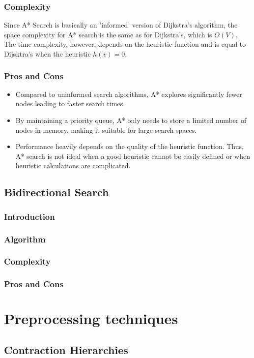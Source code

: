 		\subsubsection{Complexity}
		Since A* Search is basically an 'informed' version of Dijkstra's algorithm, the space complexity for A* search is the same as for Dijkstra's, which is $O(V)$.
		The time complexity, however, depends on the heuristic function and is equal to Dijsktra's when the heuristic $h(v) = 0$.
		\subsubsection{Pros and Cons}
			\begin{itemize}
				\item Compared to uninformed search algorithms, A* explores significantly fewer nodes leading to faster search times. 
				\item By maintaining a priority queue, A* only needs to store a limited number of nodes in memory, making it suitable for large search spaces.
				\item Performance heavily depends on the quality of the heuristic function. Thus, A* search is not ideal when a good heuristic cannot be easily defined or when heuristic calculations are complicated.
			\end{itemize}
	\subsection{Bidirectional Search}
		\subsubsection{Introduction}
		\subsubsection{Algorithm}
		\subsubsection{Complexity}
		\subsubsection{Pros and Cons}
\section{Preprocessing techniques}
\subsection{Contraction Hierarchies}









